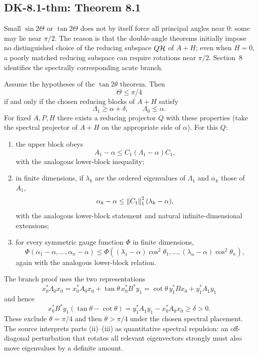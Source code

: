\subsection*{DK-8.1-thm: Theorem 8.1}
Small $\sin2\Theta$ or $\tan2\Theta$ does not by itself force all principal angles near $0$: some may lie near $\pi/2$.  The reason is that the double-angle theorems initially impose no distinguished choice of the reducing subspace $Q\mathcal{H}$ of $A+H$; even when $H=0$, a poorly matched reducing subspace can require rotations near $\pi/2$.  Section~8 identifies the spectrally corresponding acute branch.

Assume the hypotheses of the $\tan2\theta$ theorem.  Then
\[
 \Theta\le\pi/4
\]
if and only if the chosen reducing blocks of $A+H$ satisfy
\[
 \Lambda_1\ge\alpha+\delta,
 \qquad
 \Lambda_0\le\alpha.
\]
For fixed $A,P,H$ there exists a reducing projector $Q$ with these properties (take the spectral projector of $A+H$ on the appropriate side of $\alpha$).  For this $Q$:
\begin{enumerate}[label=(\roman*)]
\item the upper block obeys
\[
 A_1-\alpha\le C_1(\Lambda_1-\alpha)C_1,
\]
with the analogous lower-block inequality;
\item in finite dimensions, if $\lambda_k$ are the ordered eigenvalues of $\Lambda_1$ and $\alpha_k$ those of $A_1$,
\[
 \alpha_k-\alpha\le\left\lVert C_1\right\rVert_1^2(\lambda_k-\alpha),
\]
with the analogous lower-block statement and natural infinite-dimensional extensions;
\item for every symmetric gauge function $\Phi$ in finite dimensions,
\[
 \Phi(\alpha_1-\alpha,\ldots,\alpha_n-\alpha)
 \le
 \Phi((\lambda_1-\alpha)\cos^2\theta_1,\ldots,
      (\lambda_n-\alpha)\cos^2\theta_n),
\]
again with the analogous lower-block relation.
\end{enumerate}
The branch proof uses the two representations
\begin{equation}
 x_0^*\Lambda_0x_0
 =x_0^*A_0x_0+\tan\theta\,x_0^*B^*y_1
 =\cot\theta\,y_1^*Bx_0+y_1^*A_1y_1
 \tag{8.1}
\end{equation}
and hence
\begin{equation}
 x_0^*B^*y_1(\tan\theta-\cot\theta)
 =y_1^*A_1y_1-x_0^*A_0x_0\ge\delta>0.
 \tag{8.2}
\end{equation}
These exclude $\theta=\pi/4$ and then $\theta>\pi/4$ under the chosen spectral placement.  The source interprets parts (ii)--(iii) as quantitative spectral repulsion: an off-diagonal perturbation that rotates all relevant eigenvectors strongly must also move eigenvalues by a definite amount.

